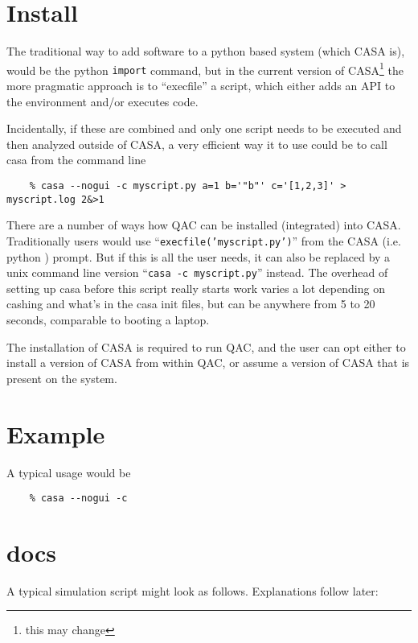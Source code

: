 \documentclass[11pt,twoside]{article}
\begin{document}
\section{Install}

The traditional way to add software to a python based system (which CASA is), would be the
python {\tt import} command, but in the current version of CASA\footnote{this may change}
the more pragmatic approach is to ``execfile'' a script, which either adds an API to the
environment and/or executes code.

Incidentally, if these are combined and only one script needs to be executed and then analyzed
outside of CASA, a very efficient way it to use could be to call casa from the command line

\footnotesize
\begin{verbatim}
    % casa --nogui -c myscript.py a=1 b='"b"' c='[1,2,3]' > myscript.log 2&>1
\end{verbatim}
\normalsize

There are a number of ways how QAC can be installed (integrated) into CASA.
Traditionally users would use
``{\tt     execfile('myscript.py')}''
from the CASA (i.e. python ) prompt. But if this is all the user needs, it can
also be replaced by a unix command line version
``{\tt     casa -c myscript.py}''
instead. The overhead of setting up casa before this script really starts work
varies a lot depending on cashing and what's in the casa init files, but can
be anywhere from 5 to 20 seconds, comparable to booting a laptop.

The installation of CASA is required to run QAC, and the user can opt either to install a version
of CASA from within QAC, or assume a version of CASA that is present on the system.

\section{Example}

A typical usage would be

\begin{verbatim}
    % casa --nogui -c 
\end{verbatim}


\section{docs}

A typical simulation script might look as follows. Explanations follow later:
\end{document}
